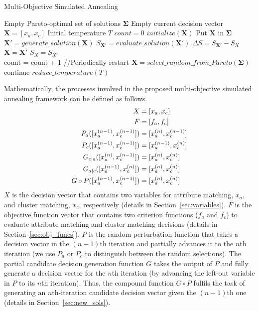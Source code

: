 \begin{algorithm}
\caption{Multi-Objective Simulated Annealing}
\label{MOSA}
\begin{algorithmic}
\REQUIRE Empty Pareto-optimal set of solutions $\mathbf{\Sigma}$
\REQUIRE Empty current decision vector $\mathbf{X}=[x_a,x_c]$
\REQUIRE Initial temperature $T$
\STATE $count=0$
\STATE $initialize(\mathbf{X})$ \hspace{1in} %
\STATE Put $\mathbf{X}$ in $\mathbf{\Sigma}$
\STATE $\mathbf{X}'=generate\_solution(\mathbf{X})$
\STATE $S_{\mathbf{X}'}=evaluate\_solution(\mathbf{X}')$
\STATE $\Delta S = S_{\mathbf{X}'} - S_X$
\STATE $\mathbf{X}=\mathbf{X}'$
\STATE $S_X=S_{X'}$
\ENDIF\\
\STATE count = count + 1
\STATE //Periodically restart
\STATE $\mathbf{X}=select\_random\_from\_Pareto(\mathbf{\Sigma})$
\STATE continue
\ENDIF
\STATE $reduce\_temperature(T)$
\ENDWHILE
\end{algorithmic}
\end{algorithm}

Mathematically, the processes involved in the proposed multi-objective simulated annealing framework can be defined as follows.
\begin{align}
\notag X&=[x_a, x_c]\\
\notag F&=[f_a, f_c]\\
\notag P_a([x_a^{(n-1)},x_c^{(n-1)}])&=[x_a^{(n)}, x_c^{(n-1)}]\\
\notag P_c([x_a^{(n-1)},x_c^{(n-1)}])&=[x_a^{(n-1)}, x_c^{(n)}]\\
\notag G_{c|a}([x_a^{(n)},x_c^{(n-1)}])&=[x_a^{(n)}, x_c^{(n)}]\\
\notag G_{a|c}([x_a^{(n-1)},x_c^{(n)}])&=[x_a^{(n)}, x_c^{(n)}]\\
\notag G\circ P([x_a^{(n-1)},x_c^{(n-1)}])&=[x_a^{(n)}, x_c^{(n)}]
\end{align}
$X$ is the decision vector that contains two variables for attribute matching, $x_a$, and cluster matching, $x_c$, respectively (details in Section~\ref{sec:variables}). $F$ is the objective function vector that contains two criterion functions ($f_a$ and $f_c$) to evaluate attribute matching and cluster matching decisions (details in Section~\ref{sec:obj_funcs}). $P$ is the random perturbation function that takes a decision vector in the $(n-1)$th iteration and partially advances it to the $n$th iteration (we use $P_a$ or $P_c$ to distinguish between the random selections). The partial candidate decision generation function $G$ takes the output of $P$ and fully generate a decision vector for the $n$th iteration (by advancing the left-out variable in $P$ to its $n$th iteration). Thus, the compound function $G\circ P$ fulfils the task of generating an $n$th-iteration candidate decision vector given the $(n-1)$th one (details in Section~\ref{sec:new_sols}).
